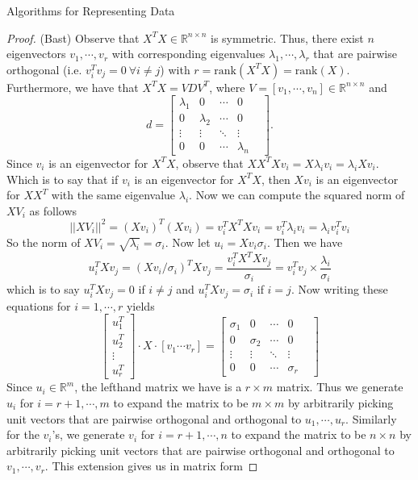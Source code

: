 \documentclass[12pt]{pom_thesis}
\begin{document}
\begin{chapter}{Algorithms for Representing Data}
\begin{proof}(Bast) Observe that $X^TX \in \mathbb{R}^{n \times n}$ is symmetric. Thus, there exist $n$ eigenvectors $v_1,\cdots,v_r$ with corresponding eigenvalues $\lambda_1,\cdots,\lambda_r$ that are pairwise orthogonal (i.e. $v^T_iv_j=0 \ \forall i \neq j$) with $r = \text{rank}(X^TX) = \text{rank}(X)$. Furthermore, we have that $X^TX = VDV^T$, where $V=[v_1,\cdots,v_n] \in \mathbb{R}^{n\times n}$ and  $$d = \begin{bmatrix}
	\lambda_1  & 0     & \cdots             & 0    \\
	0  & \lambda_2 & \cdots & 0        \\
	\vdots  & \vdots & \ddots & \vdots &     \\
	0 & 0 & \cdots & \lambda_n
	\end{bmatrix}.$$ 
	Since $v_i$ is an eigenvector for $X^TX$, observe that $XX^TXv_i = X\lambda_iv_i=\lambda_iXv_i$. Which is to say that if  $v_i$ is an eigenvector for $X^TX$, then  $Xv_i$ is an eigenvector for $XX^T$ with the same eigenvalue $\lambda_i$. Now we can compute the squared norm of $XV_i$ as follows
	$$||XV_i||^2 = (Xv_i)^T(Xv_i)=v_i^TX^TXv_i = v_i^T\lambda_i v_i = \lambda_i v_i^T v_i$$
	So the norm of $XV_i = \sqrt{\lambda_i} = \sigma_i.$ Now let $u_i=Xv_i\sigma_i$. Then we have 
	$$u_i^TXv_j = (Xv_i/\sigma_i)^TXv_j = \frac{v_i^TX^TXv_j}{\sigma_i} = v_i^Tv_j \times \frac{\lambda_i}{\sigma_i}$$
	which is to say $u_i^TXv_j=0$ if $i\neq j$ and $u_i^TXv_j=\sigma_i$ if $i=j$. Now writing these equations for $i=1,\cdots,r$ yields
	 $$\begin{bmatrix}
	 u_1^T \\
	 u_2^T        \\
	 \vdots      \\
	 u_r^T 
	 \end{bmatrix} \cdot X \cdot [v_1 \cdots v_r] =  \begin{bmatrix}
	 \sigma_1  & 0     & \cdots             & 0    \\
	 0  & \sigma_2 & \cdots & 0        \\
	 \vdots  & \vdots & \ddots & \vdots &     \\
	 0 & 0 & \cdots & \sigma_r
	 \end{bmatrix}$$
	 Since $u_i \in \mathbb{R}^m$, the lefthand matrix we have is a $r \times m$ matrix. Thus we generate $u_i$ for $i=r+1,\cdots,m$ to expand the matrix to be $m \times m$ by arbitrarily picking unit vectors that are pairwise orthogonal and orthogonal to $u_1,\cdots,u_r$. Similarly for the $v_i$'s, we generate $v_i$ for $i=r+1,\cdots,n$ to expand the matrix to be $n \times n$ by arbitrarily picking unit vectors that are pairwise orthogonal and orthogonal to $v_1,\cdots,v_r$. This extension gives us in matrix form

\end{proof}
\end{chapter}
\end{document}
